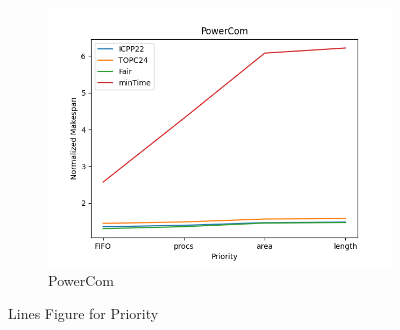\documentclass{article}
\begin{document}
\begin{figure}[htbp]
\begin{subfigure}[b]{0.32\textwidth}\includegraphics[width=\textwidth]{Results/Priority/Priority_PowerCom}\caption{PowerCom}\label{fig:lines_figures_Priority_PowerCom}\end{subfigure}
\hfill
\caption{Lines Figure for Priority}
\label{fig:lines_figures_Priority}
\end{figure}
\end{document}
